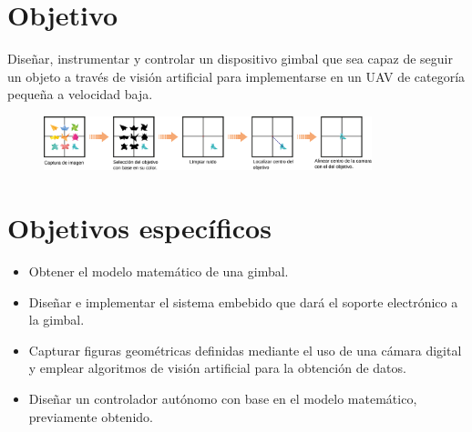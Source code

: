 \section{Objetivo}
Diseñar, instrumentar y controlar un dispositivo gimbal que sea capaz de seguir un objeto a través de visión artificial para
implementarse en un UAV de categoría pequeña a velocidad baja.
\begin{figure}[htb]
	\centering
	\includegraphics[width=0.85\textwidth]{Contenido/Cuerpo/Capitulo1/Fig0.eps}
	\label{fig:Introduccion:Fig1}
\end{figure}

\section{Objetivos específicos}
\begin{itemize}
	\item Obtener el modelo matemático de una gimbal.
	\item Diseñar e implementar el sistema embebido que dará el soporte electrónico a la gimbal.
	\item Capturar figuras geométricas definidas  mediante el uso de una cámara digital y emplear algoritmos de visión artificial para la obtención de datos.
	\item Diseñar un controlador autónomo con base en el modelo matemático, previamente obtenido.
\end{itemize}

